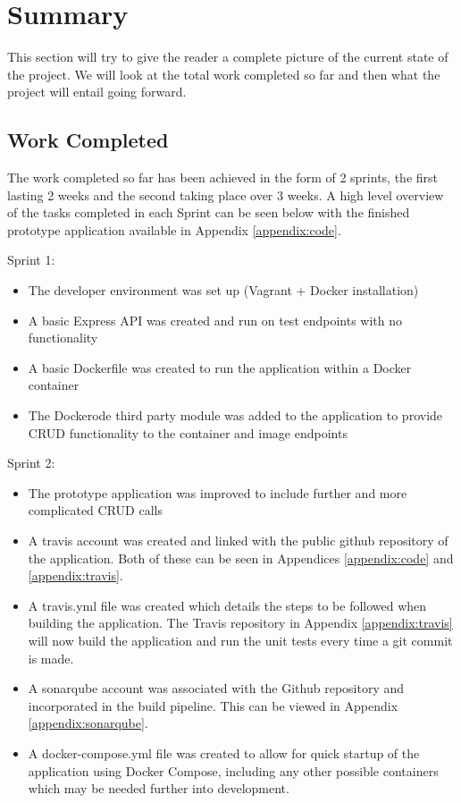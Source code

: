 \section{Summary}
This section will try to give the reader a complete picture of the current state of the project. We will look at the total work completed so far and then what the project will entail going forward.

\subsection{Work Completed}
The work completed so far has been achieved in the form of 2 sprints, the first lasting 2 weeks and the second taking place over 3 weeks. A high level overview of the tasks completed in each Sprint can be seen below with the finished prototype application available in Appendix \ref{appendix:code}.

Sprint 1:
\begin{itemize}
	\item The developer environment was set up (Vagrant + Docker installation)
	\item A basic Express \gls{API} was created and run on test endpoints with no functionality
	\item A basic Dockerfile was created to run the application within a Docker container
	\item The Dockerode third party module was added to the application to provide \gls{CRUD} functionality to the container and image endpoints
\end{itemize} 

Sprint 2:
\begin{itemize}
	\item The prototype application was improved to include further and more complicated \gls{CRUD} calls
	\item A \gls{travis} account was created and linked with the public \gls{github} repository of the application. Both of these can be seen in Appendices \ref{appendix:code} and \ref{appendix:travis}.
	\item A travis.yml file was created which details the steps to be followed when building the application. The Travis repository in Appendix \ref{appendix:travis} will now build the application and run the unit tests every time a \gls{git} commit is made.
	\item A \gls{sonarqube} account was associated with the Github repository and incorporated in the build pipeline. This can be viewed in Appendix \ref{appendix:sonarqube}.
	\item A docker-compose.yml file was created to allow for quick startup of the application using \gls{Docker Compose}, including any other possible containers which may be needed further into development.
\end{itemize}

